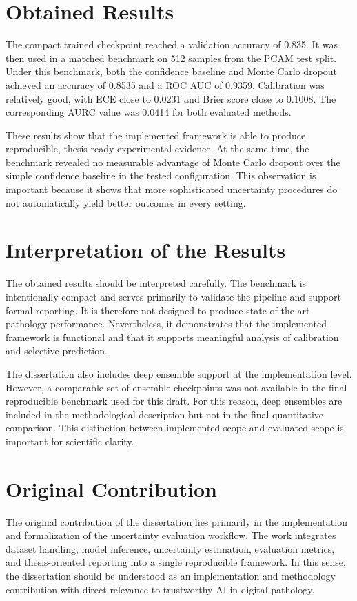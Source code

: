 \section{Obtained Results}

The compact trained checkpoint reached a validation accuracy of 0.835. It was then used in a matched benchmark on 512 samples from the PCAM test split. Under this benchmark, both the confidence baseline and Monte Carlo dropout achieved an accuracy of 0.8535 and a ROC AUC of 0.9359. Calibration was relatively good, with ECE close to 0.0231 and Brier score close to 0.1008. The corresponding AURC value was 0.0414 for both evaluated methods.

These results show that the implemented framework is able to produce reproducible, thesis-ready experimental evidence. At the same time, the benchmark revealed no measurable advantage of Monte Carlo dropout over the simple confidence baseline in the tested configuration. This observation is important because it shows that more sophisticated uncertainty procedures do not automatically yield better outcomes in every setting.

\section{Interpretation of the Results}

The obtained results should be interpreted carefully. The benchmark is intentionally compact and serves primarily to validate the pipeline and support formal reporting. It is therefore not designed to produce state-of-the-art pathology performance. Nevertheless, it demonstrates that the implemented framework is functional and that it supports meaningful analysis of calibration and selective prediction.

The dissertation also includes deep ensemble support at the implementation level. However, a comparable set of ensemble checkpoints was not available in the final reproducible benchmark used for this draft. For this reason, deep ensembles are included in the methodological description but not in the final quantitative comparison. This distinction between implemented scope and evaluated scope is important for scientific clarity.

\section{Original Contribution}

The original contribution of the dissertation lies primarily in the implementation and formalization of the uncertainty evaluation workflow. The work integrates dataset handling, model inference, uncertainty estimation, evaluation metrics, and thesis-oriented reporting into a single reproducible framework. In this sense, the dissertation should be understood as an implementation and methodology contribution with direct relevance to trustworthy AI in digital pathology.
